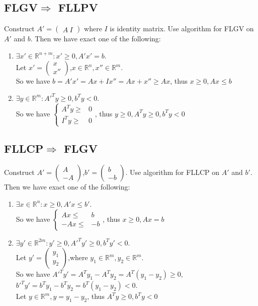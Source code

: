 	\subsection{FLGV$\Rightarrow$ FLLPV}
	Construct \boldmath $A'=
	\left(\begin{aligned}
	A\ I
	\end{aligned}\right)$ where $I$ is identity matrix. Use algorithm for FLGV on $A'$ and $b$. Then we have exact one of the following:
	\begin{enumerate}
		\item $\exists x'\in \mathbb{R}^{n+m}:x'\geq 0,A'x'=b$.\\ Let $x'=\left(\begin{aligned}
		x\\x''
		\end{aligned}\right)$,$x\in \mathbb{R}^n,x''\in \mathbb{R}^m$.\\ So we have $b=A'x'=Ax+Ix''=Ax+x''\geq Ax$, thus $x\geq 0,Ax\leq b$
		\item $\exists y\in \mathbb{R}^{m}:A'^Ty\geq 0,b^Ty<0$.\\ So we have $\left\{\begin{aligned}
		A^Ty\geq& 0\\
		I^Ty\geq& 0
		\end{aligned}\right.$, thus $y\geq0,A^Ty\geq 0,b^Ty<0$
	\end{enumerate}
	\subsection{FLLCP$\Rightarrow$ FLGV}
	Construct \boldmath $A'=
	\left(\begin{aligned}
	A\\ -A
	\end{aligned}\right)$,$b'=\left(\begin{aligned}
	b\\ -b
	\end{aligned}\right)$. Use algorithm for FLLCP on $A'$ and $b'$. Then we have exact one of the following:
	\begin{enumerate}
		\item $\exists x\in \mathbb{R}^n:x\geq 0,A'x\leq b'$.\\ So we have $\left\{\begin{aligned}
		Ax\leq& b\\
		-Ax\leq& -b
		\end{aligned}\right.$, thus $x\geq 0,Ax=b$
		\item $\exists y'\in \mathbb{R}^{2m}:y'\geq 0,A'^Ty'\geq 0,b^Ty'<0$.\\ Let $y'=\left(\begin{aligned}
		y_1\\ y_2
		\end{aligned}\right)$,where $y_1\in \mathbb{R}^m,y_2\in \mathbb{R}^m$.\\ So we have $A'^Ty'=A^Ty_1-A^Ty_2=A^T(y_1-y_2)\geq 0$, $b'^Ty'=b^Ty_1-b^Ty_2=b^T(y_1-y_2)<0$.\\ Let $y\in \mathbb{R}^m,y=y_1-y_2$, thus $A^Ty\geq 0,b^Ty<0$
	\end{enumerate}
